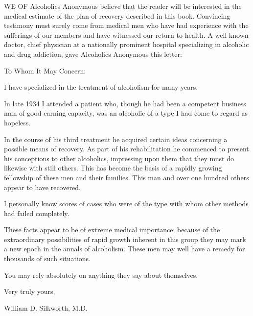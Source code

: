 
\bbChapterPreamble


\begin{biblechapter}
    WE OF Alcoholics Anonymous believe that the reader will be interested 
    in the medical estimate of the plan of recovery described in this book. 
\verse Convincing testimony must surely come from medical men 
    who have had experience with the sufferings of our members 
    and have witnessed our return to health. 
\verse A well known doctor, 
    chief physician at a nationally prominent hospital 
    specializing in alcoholic and drug addiction, 
    gave Alcoholics Anonymous this letter:
\end{biblechapter}


\begin{biblechapter}
    To Whom It May Concern:

\verse I have specialized in the treatment of alcoholism for many years.

    In late 1934 I attended a patient who, 
    though he had been a competent business man of good earning capacity, 
    was an alcoholic of a type I had come to regard as hopeless.

\verse In the course of his third treatment 
    he acquired certain ideas concerning a possible means of recovery. 
\verse As part of his rehabilitation 
    he commenced to present his conceptions to other alcoholics, 
    impressing upon them that they must do likewise with still others. 
\verse This has become the basis of a rapidly growing fellowship 
    of these men and their families. 
\verse This man and over one hundred others appear to have recovered.

    I personally know scores of cases who were of the type 
    with whom other methods had failed completely.

    These facts appear to be of extreme medical importance; 
    because of the extraordinary possibilities 
    of rapid growth inherent in this group 
    they may mark a new epoch in the annals of alcoholism. 
\verse These men may well have a remedy for thousands of such situations.

\verse You may rely absolutely on anything they say about themselves.

\verse Very truly yours, 

William D. Silkworth, M.D.
\end{biblechapter}


